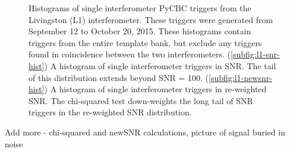 \begin{figure}[!ht]%
\centering


  \caption[PyCBC SNR and re-weighted SNR histograms]{Histograms of single interferometer PyCBC %
           triggers from the Livingston (L1) interferometer. %
           These triggers were generated from September 12 to October 20, 2015. These histograms %
           contain triggers from the entire template bank, but %
           exclude any triggers found in coincidence between the two interferometers. %
           (\ref{subfig:l1-snr-hist}) A histogram of single interferometer triggers in SNR. %
           The tail of this distribution extends beyond SNR = 100. %
           (\ref{subfig:l1-newsnr-hist}) A histogram of single interferometer triggers in re-weighted SNR. %
           The chi-squared test down-weights the long tail of SNR triggers %
           in the re-weighted SNR distribution.}
  \label{fig:cbc-newsnr-histograms}
\end{figure}

Add more - chi-squared and newSNR calculations, picture of signal buried in noise
